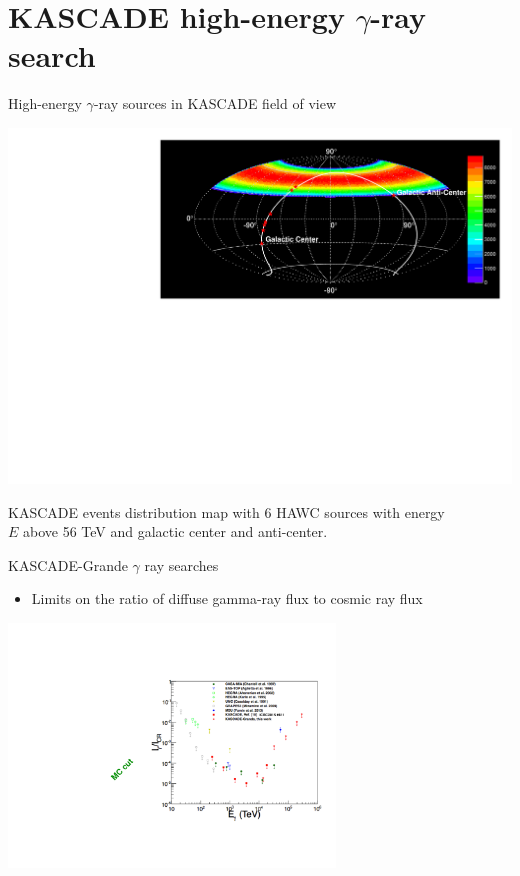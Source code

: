 \section{KASCADE high-energy \texorpdfstring{$\gamma$}{gamma}-ray search}

\begin{frame}{High-energy $\gamma$-ray sources in KASCADE field of view}
  
  \begin{center}
    \includegraphics[width=1\textwidth]{pics/Skymap_6srcs.pdf}
    
 KASCADE events distribution map
  with 6 HAWC sources with energy \\$E$ above 56 TeV and galactic center and anti-center.
\end{center}
\end{frame}

\begin{frame}{KASCADE-Grande $\gamma$ ray searches}
\begin{itemize}
 \item Limits on the ratio of diffuse gamma-ray flux to cosmic ray flux
\end{itemize}

\begin{center}
    \includegraphics[width=0.65\textwidth]{pics/KASCADE-Grande_UHECR2016.pdf}
\end{center}
\end{frame}

